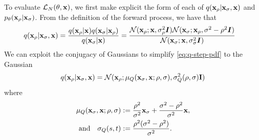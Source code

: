 To evaluate $\mathcal{L}_N(\theta, {\mathbf{x}})$, we first make explicit the form of each of $q({\mathbf{x}}_{\rho} | {\mathbf{x}}_{\sigma}, {\mathbf{x}})$ and $p_\theta({\mathbf{x}}_{\rho} | {\mathbf{x}}_{\sigma})$. From the definition of the forward process, we have that
\begin{align} \label{eq:q-step-pdf}
    q({\mathbf{x}}_{\rho} | {\mathbf{x}}_{\sigma}, {\mathbf{x}}) &= \frac{q({\mathbf{x}}_{\rho} | {\mathbf{x}}) q({\mathbf{x}}_{\sigma} | {\mathbf{x}}_{\rho})}{q({\mathbf{x}}_{\sigma}|{\mathbf{x}})} = \frac{{\mathcal{N}}({\mathbf{x}}_{\rho}; {\mathbf{x}}, \sigma_{\rho}^2 {\bm{I}}) {\mathcal{N}}({\mathbf{x}}_{\sigma}; {\mathbf{x}}_{\rho}, \sigma^2-\rho^2 {\bm{I}}) }{{\mathcal{N}}({\mathbf{x}}_{\sigma}; {\mathbf{x}}, \sigma_{\sigma}^2 {\bm{I}})}
\end{align}
We can exploit the conjugacy of Gaussians to simplify \cref{eq:q-step-pdf} to the Gaussian
\begin{align}
    q({\mathbf{x}}_\rho|{\mathbf{x}}_\sigma,{\mathbf{x}}) = {\mathcal{N}}( {\mathbf{x}}_\rho; \mathbf{\mu}_Q({\mathbf{x}}_\sigma, {\mathbf{x}}; \rho, \sigma), \sigma_Q^2(\rho, \sigma) \mathbf{I})
\end{align}
where
\begin{align}
    \mathbf{\mu}_Q({\mathbf{x}}_\sigma, {\mathbf{x}}; \rho, \sigma) &:= \frac{\rho^2}{\sigma^2} {\mathbf{x}}_\sigma + \frac{\sigma^2-\rho^2}{\sigma^2} {\mathbf{x}}, \\
    \text{and}\quad 
    \sigma_Q(s, t) &:= \frac{\rho^2 (\sigma^2-\rho^2)}{\sigma^2}.
\end{align}

